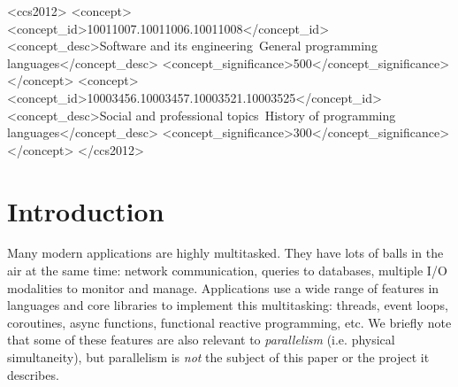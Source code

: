 \documentclass[acmsmall,anonymous,review]{acmart}\settopmatter{printfolios=true,printccs=false,printacmref=false}
\begin{document}
\begin{CCSXML}
<ccs2012>
<concept>
<concept_id>10011007.10011006.10011008</concept_id>
<concept_desc>Software and its engineering~General programming languages</concept_desc>
<concept_significance>500</concept_significance>
</concept>
<concept>
<concept_id>10003456.10003457.10003521.10003525</concept_id>
<concept_desc>Social and professional topics~History of programming languages</concept_desc>
<concept_significance>300</concept_significance>
</concept>
</ccs2012>
\end{CCSXML}




\maketitle




\section{Introduction}

Many modern applications are highly multitasked.
They have lots of balls in the air at the same time: network communication, queries to databases, multiple I/O modalities to monitor and manage.
Applications use a wide range of features in languages and core libraries to implement this multitasking: threads, event loops, coroutines, async functions, functional reactive programming, etc.
We briefly note that some of these features are also relevant to \emph{parallelism} (i.e. physical simultaneity), but parallelism is \emph{not} the subject of this paper or the project it describes.
\end{document}
